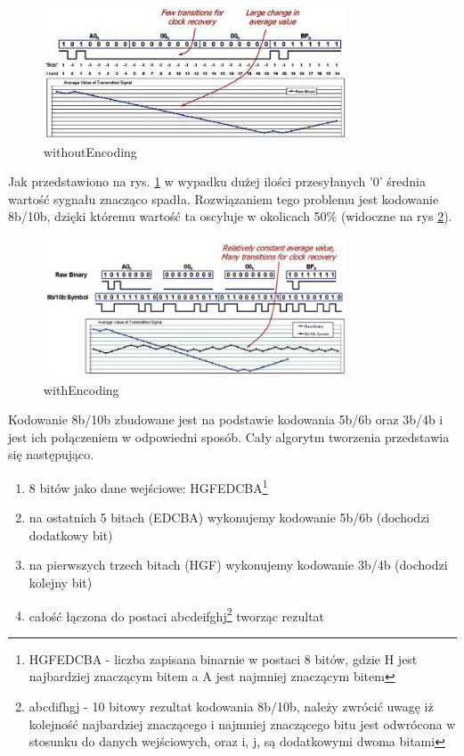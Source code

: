 \documentclass{BscUS}
\begin{document}
\begin{figure}[H]
\centering
\includegraphics[width=0.8\textwidth]{./img/withoutEncoding}
\caption{withoutEncoding}
\label{fig:withoutEncoding}
\end{figure}
Jak przedstawiono na rys. \ref{fig:withoutEncoding} w wypadku dużej ilości przesyłanych '0' średnia wartość sygnału znacząco spadła. Rozwiązaniem tego problemu jest kodowanie 8b/10b, dzięki któremu wartość ta oscyluje w okolicach 50\% (widoczne na rys \ref{fig:withEncoding}).
\begin{figure}[H]
\centering
\includegraphics[width=0.8\textwidth]{./img/withEncoding}
\caption{withEncoding}
\label{fig:withEncoding}
\end{figure}
Kodowanie 8b/10b zbudowane jest na podstawie kodowania 5b/6b oraz 3b/4b i jest ich połączeniem w odpowiedni sposób. Cały algorytm tworzenia przedstawia się następująco.
\begin{enumerate}
\item 8 bitów jako dane wejściowe: HGFEDCBA\footnote{HGFEDCBA - liczba zapisana binarnie w postaci 8 bitów, gdzie H jest najbardziej znaczącym bitem a A jest najmniej znaczącym bitem}
\item na ostatnich 5 bitach (EDCBA) wykonujemy kodowanie 5b/6b (dochodzi dodatkowy bit)
\item na pierwszych trzech bitach (HGF) wykonujemy kodowanie 3b/4b (dochodzi kolejny bit)
\item całość łączona do postaci abcdeifghj\footnote{abcdifhgj - 10 bitowy rezultat kodowania 8b/10b, należy zwrócić uwagę iż kolejność najbardziej znaczącego i najmniej znaczącego bitu jest odwrócona w stosunku do danych wejściowych, oraz i, j, są dodatkowymi dwoma bitami} tworząc rezultat
\end{enumerate}
\end{document}
